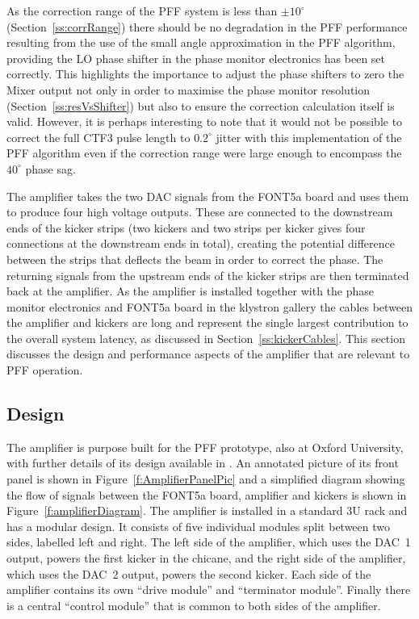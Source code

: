 As the correction range of the PFF system is less than \(\pm10^\circ\) (Section~\ref{ss:corrRange}) there should be no degradation in the PFF performance resulting from the use of the small angle approximation in the PFF algorithm, providing the LO phase shifter in the phase monitor electronics has been set correctly. This highlights the importance to adjust the phase shifters to zero the Mixer output not only in order to maximise the phase monitor resolution (Section~\ref{ss:resVsShifter}) but also to ensure the correction calculation itself is valid. However, it is perhaps interesting to note that it would not be possible to correct the full CTF3 pulse length to \(0.2^\circ\) jitter with this implementation of the PFF algorithm even if the correction range were large enough to encompass the \(40^\circ\) phase sag.


The amplifier takes the two DAC signals from the FONT5a board and
uses them to produce four high voltage outputs. These are connected to the downstream ends of the kicker strips (two kickers and two strips per kicker gives four connections at the downstream ends in total), creating the potential difference between the strips that deflects the beam in order to correct the phase. The returning signals from the upstream ends of the kicker strips are then terminated back at the amplifier. As the amplifier is installed together with the phase monitor electronics and FONT5a board in the klystron gallery the cables between the amplifier and kickers are long and represent the single largest contribution to the overall system latency, as discussed in Section~\ref{ss:kickerCables}. This section discusses the design and performance aspects of the amplifier that are relevant to PFF operation.

\subsection{Design}
\label{ss:ampDesign}

The amplifier is purpose built for the PFF prototype, also at Oxford University, with further details of its design available in \cite{colinCLIC16}. An annotated picture of its front panel is shown in Figure~\ref{f:AmplifierPanelPic} and a simplified diagram showing the flow of signals between the FONT5a board, amplifier and kickers is shown in Figure~\ref{f:amplifierDiagram}.
The amplifier is installed in a standard 3U rack and has a modular design. It consists of five individual modules split between two sides, labelled left and right. The left side of the amplifier, which uses the DAC~1 output, powers the first kicker in the chicane, and the right side of the amplifier, which uses the DAC~2 output, powers the second kicker. Each side of the amplifier contains its own ``drive module'' and ``terminator module''. Finally there is a central ``control module'' that is common to both sides of the amplifier.

